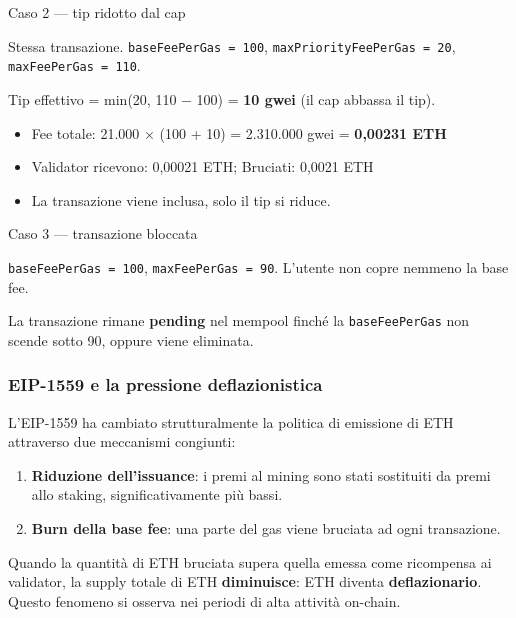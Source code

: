\documentclass[
  italian,
  openany]{book}
\providecommand{\tightlist}{%
  \setlength{\itemsep}{0pt}\setlength{\parskip}{0pt}}
\begin{document}
\begin{callouttip}{Caso 2 — tip ridotto dal cap}

Stessa transazione. \texttt{baseFeePerGas\ =\ 100},
\texttt{maxPriorityFeePerGas\ =\ 20}, \texttt{maxFeePerGas\ =\ 110}.

Tip effettivo = min(20, 110 − 100) = \textbf{10 gwei} (il cap abbassa il
tip).

\begin{itemize}
\tightlist
\item
  Fee totale: 21.000 × (100 + 10) = 2.310.000 gwei = \textbf{0,00231
  ETH}
\item
  Validator ricevono: 0,00021 ETH; Bruciati: 0,0021 ETH
\item
  La transazione viene inclusa, solo il tip si riduce.
\end{itemize}

\end{callouttip}

\begin{callouttip}{Caso 3 — transazione bloccata}

\texttt{baseFeePerGas\ =\ 100}, \texttt{maxFeePerGas\ =\ 90}. L'utente
non copre nemmeno la base fee.

La transazione rimane \textbf{pending} nel mempool finché la
\texttt{baseFeePerGas} non scende sotto 90, oppure viene eliminata.

\end{callouttip}

\subsubsection{EIP-1559 e la pressione
deflazionistica}\label{eip-1559-e-la-pressione-deflazionistica}

L'EIP-1559 ha cambiato strutturalmente la politica di emissione di ETH
attraverso due meccanismi congiunti:

\begin{enumerate}
\def\labelenumi{\arabic{enumi}.}
\tightlist
\item
  \textbf{Riduzione dell'issuance}: i premi al mining sono stati
  sostituiti da premi allo staking, significativamente più bassi.
\item
  \textbf{Burn della base fee}: una parte del gas viene bruciata ad ogni
  transazione.
\end{enumerate}

Quando la quantità di ETH bruciata supera quella emessa come ricompensa
ai validator, la supply totale di ETH \textbf{diminuisce}: ETH diventa
\textbf{deflazionario}. Questo fenomeno si osserva nei periodi di alta
attività on-chain.
\end{document}
